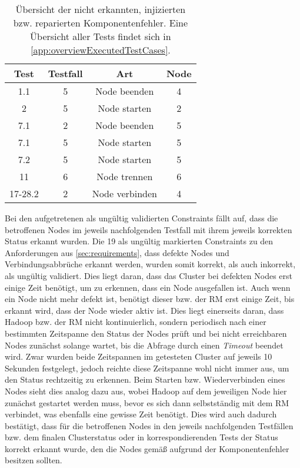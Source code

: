 \begin{table}[h]
    \begin{tabular}{c|ccc}
    	 \gls{Test}   & \gls{Testfall} &      Art       & Node \\ \hline
    	  1.1   &    5     &  Node beenden  &  4   \\
    	   2    &    5     &  Node starten  &  2   \\
    	  7.1   &    2     &  Node beenden  &  5   \\
    	  7.1   &    5     &  Node starten  &  5   \\
    	  7.2   &    5     &  Node starten  &  5   \\
    	  11    &    6     &  Node trennen  &  6   \\
    	17-28.2 &    2     & Node verbinden &  4
    \end{tabular} 
    \caption[Übersicht der nicht erkannten, injizierten/reparierten Komponentenfehler]
    {Übersicht der nicht erkannten, injizierten bzw. reparierten Komponentenfehler.
    Eine Übersicht aller Tests findet sich in \cref{app:overviewExecutedTestCases}.}
    \label{tab:notDetectedFaults}
\end{table}

Bei den aufgetretenen als ungültig validierten Constraints fällt auf, dass die betroffenen Nodes im jeweils nachfolgenden \gls{Testfall} mit ihrem jeweils korrekten Status erkannt wurden.
Die 19 als ungültig markierten Constraints zu den Anforderungen aus \cref{sec:requirements}, dass defekte Nodes und Verbindungsabbrüche erkannt werden, wurden somit korrekt, als auch inkorrekt, als ungültig validiert.
Dies liegt daran, dass das Cluster bei defekten Nodes erst einige Zeit benötigt, um zu erkennen, dass ein Node ausgefallen ist.
Auch wenn ein Node nicht mehr defekt ist, benötigt dieser bzw. der \gls{RM} erst einige Zeit, bis erkannt wird, dass der Node wieder aktiv ist.
Dies liegt einerseits daran, dass Hadoop bzw. der \gls{RM} nicht kontinuierlich, sondern periodisch nach einer bestimmten Zeitspanne den Status der Nodes prüft und bei nicht erreichbaren Nodes zunächst solange wartet, bis die Abfrage durch einen \emph{Timeout} beendet wird.
Zwar wurden beide Zeitspannen im getesteten Cluster auf jeweils 10 Sekunden festgelegt, jedoch reichte diese Zeitspanne wohl nicht immer aus, um den Status rechtzeitig zu erkennen.
Beim Starten bzw. Wiederverbinden eines Nodes sieht dies analog dazu aus, wobei Hadoop auf dem jeweiligen Node hier zunächst gestartet werden muss, bevor es sich dann selbstständig mit dem \gls{RM} verbindet, was ebenfalls eine gewisse Zeit benötigt.
Dies wird auch dadurch bestätigt, dass für die betroffenen Nodes in den jeweils nachfolgenden Testfällen bzw. dem finalen Clusterstatus oder in korrespondierenden \glspl{Test} der Status korrekt erkannt wurde, den die Nodes gemäß aufgrund der Komponentenfehler besitzen sollten.

